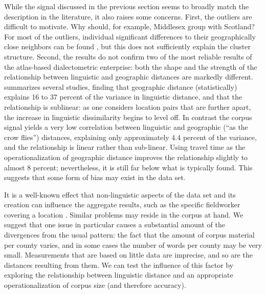\documentclass[output=paper]{LSP/langsci}
\begin{document}
While the signal discussed in the previous section seems to broadly match the description in the literature, it also raises some concerns.
First, the outliers are difficult to motivate.
Why should, for example, Middlesex group with Scotland?
For most of the outliers, individual significant differences to their geographically close neighbors can be found \citep[chapter 7]{szmrecsanyi_grammatical_2013}, but this does not sufficiently explain the cluster structure.
Second, the results do not confirm two of the most reliable results of the atlas-based dialectometric enterprise: both the shape and the strength of the relationship between linguistic and geographic distances are markedly different.
\citet{nerbonne_how_2013} summarizes several studies, finding that geographic distance (statistically) explains 16 to 37 percent of the variance in linguistic distance, and that the relationship is sublinear: as one considers location pairs that are further apart, the increase in linguistic dissimilarity begins to level off.
In contrast the corpus signal yields a very low correlation between linguistic and geographic (``as the crow flies'') distances, explaining only approximately 4.4 percent of the variance, and the relationship is linear rather than sub-linear.
Using travel time as the operationalization of geographic distance \citep{gooskens_traveling_2005} improves the relationship slightly to almost 8 percent; nevertheless, it is still far below what is typically found.
This suggests that some form of bias may exist in the data set.

It is a well-known effect that non-linguistic aspects of the data set and its creation can influence the aggregate results, such as the specific fieldworker covering a location \citep[``field worker isoglosses'', ][241ff.]{trudgill_contribution_1982}.
Similar problems may reside in the corpus at hand.
We suggest that one issue in particular causes a substantial amount of the divergences from the usual pattern: the fact that the amount of corpus material per county varies, and in some cases the number of words per county may be very small.
Measurements that are based on little data are imprecise, and so are the distances resulting from them.
We can test the influence of this factor by exploring the relationship between linguistic distance and an appropriate operationalization of corpus size (and therefore accuracy).
\end{document}
